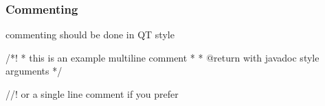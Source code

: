 \subsubsection*{Commenting}


\begin{DoxyItemize}
\item commenting should be done in QT style 
\begin{DoxyCode}
/*!
 * this is an example multiline comment
 * 
 * @return with javadoc style arguments
 */

 //! or a single line comment if you prefer
\end{DoxyCode}
 
\end{DoxyItemize}